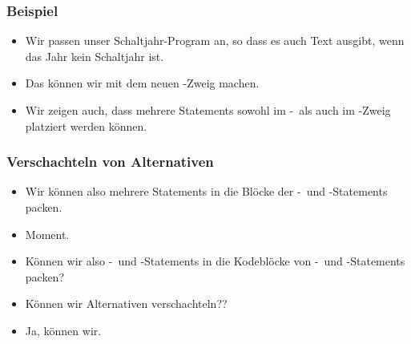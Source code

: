 \documentclass[aspectratio=169,mathserif,notheorems]{beamer}%
\begin{document}
\begin{frame}[t]%
\frametitle{Beispiel}%
%
\parbox{0.4\paperwidth}{\small{%
\begin{itemize}%
%
\item Wir passen unser Schaltjahr-Program an, so dass es auch Text ausgibt, wenn das Jahr kein Schaltjahr ist.%
%
\item<2-> Das können wir mit dem neuen -Zweig machen.%
%
\item<3-> Wir zeigen auch, dass mehrere Statements sowohl im -\ als auch im -Zweig platziert werden können.%
\end{itemize}%
}}%
%
%
%
\end{frame}%
%
\begin{frame}%
\frametitle{Verschachteln von Alternativen}%
\begin{itemize}%
\item Wir können also mehrere Statements in die Blöcke der -\ und -Statements packen.%
%
\item<2-> Moment. %
%
\item<5-> Können wir also -\ und -Statements in die Kodeblöcke von -\ und -Statements packen?%
%
\item<6-> Können wir Alternativen verschachteln??%
%
\item<7-> Ja, können wir.%
\end{itemize}%
\end{frame}%
%
\end{document}
